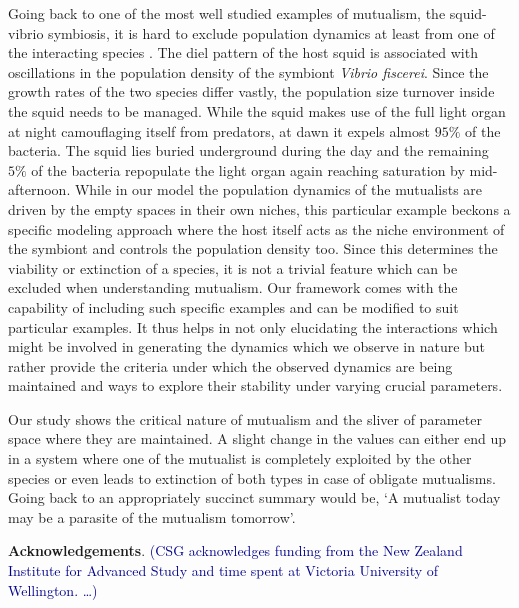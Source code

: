 \documentclass[12pt]{article}
\newcommand{\cha}[1]{\textcolor{darkblue}{(#1)}}
\begin{document}
Going back to one of the most well studied examples of mutualism, the squid-vibrio symbiosis, it is hard to exclude population dynamics at least from one of the interacting species \citep{nyholm:NRM:2004}.
The diel pattern of the host squid is associated with oscillations in the population density of the symbiont \textit{Vibrio fiscerei}.
Since the growth rates of the two species differ vastly, the population size turnover inside the squid needs to be managed.
While the squid makes use of the full light organ at night camouflaging itself from predators, at dawn it expels almost $95\%$ of the bacteria.
The squid lies buried underground during the day and the remaining $5\%$ of the bacteria repopulate the light organ again reaching saturation by mid-afternoon.
While in our model the population dynamics of the mutualists are driven by the empty spaces in their own niches, this particular example beckons a specific modeling approach where the host itself acts as the niche environment of the symbiont and controls the population density too.
Since this determines the viability or extinction of a species, it is not a trivial feature which can be excluded when understanding mutualism.
Our framework comes with the capability of including such specific examples and can be modified to suit particular examples.
It thus helps in not only elucidating the interactions which might be involved in generating the dynamics which we observe in nature but rather provide the criteria under which the observed dynamics are being maintained and ways to explore their stability under varying crucial parameters. 

Our study shows the critical nature of mutualism and the sliver of parameter space where they are maintained. 
A slight change in the values can either end up in a system where one of the mutualist is completely exploited by the other species or even leads to extinction of both types in case of obligate mutualisms.
Going back to \cite{janzen:bookchapter:1985} an appropriately succinct summary would be,
`A mutualist today may be a parasite of the mutualism tomorrow'.

\textbf{Acknowledgements}. \cha{CSG acknowledges funding from the New Zealand Institute for Advanced Study and time spent at Victoria University of Wellington. \ldots }







\renewcommand{\theequation}{A.\arabic{equation}}
\setcounter{equation}{0}
\end{document}
